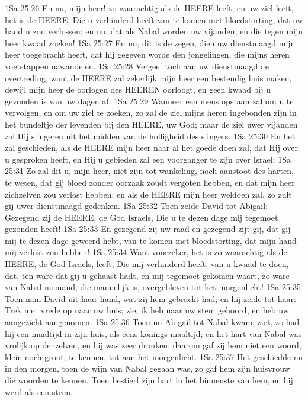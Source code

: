 1Sa 25:26  En nu, mijn heer! zo waarachtig als de HEERE leeft, en uw ziel leeft, het is de HEERE, Die u verhinderd heeft van te komen met bloedstorting, dat uw hand u zou verlossen; en nu, dat als Nabal worden uw vijanden, en die tegen mijn heer kwaad zoeken!
1Sa 25:27  En nu, dit is de zegen, dien uw dienstmaagd mijn heer toegebracht heeft, dat hij gegeven worde den jongelingen, die mijns heren voetstappen nawandelen.
1Sa 25:28  Vergeef toch aan uw dienstmaagd de overtreding, want de HEERE zal zekerlijk mijn heer een bestendig huis maken, dewijl mijn heer de oorlogen des HEEREN oorloogt, en geen kwaad bij u gevonden is van uw dagen af.
1Sa 25:29  Wanneer een mens opstaan zal om u te vervolgen, en om uw ziel te zoeken, zo zal de ziel mijns heren ingebonden zijn in het bundeltje der levenden bij den HEERE, uw God; maar de ziel uwer vijanden zal Hij slingeren uit het midden van de holligheid des slingers.
1Sa 25:30  En het zal geschieden, als de HEERE mijn heer naar al het goede doen zal, dat Hij over u gesproken heeft, en Hij u gebieden zal een voorganger te zijn over Israel;
1Sa 25:31  Zo zal dit u, mijn heer, niet zijn tot wankeling, noch aanstoot des harten, te weten, dat gij bloed zonder oorzaak zoudt vergoten hebben, en dat mijn heer zichzelven zou verlost hebben; en als de HEERE mijn heer weldoen zal, zo zult gij uwer dienstmaagd gedenken.
1Sa 25:32  Toen zeide David tot Abigail: Gezegend zij de HEERE, de God Israels, Die u te dezen dage mij tegemoet gezonden heeft!
1Sa 25:33  En gezegend zij uw raad en gezegend zijt gij, dat gij mij te dezen dage geweerd hebt, van te komen met bloedstorting, dat mijn hand mij verlost zou hebben!
1Sa 25:34  Want voorzeker, het is zo waarachtig als de HEERE, de God Israels, leeft, Die mij verhinderd heeft, van u kwaad te doen, dat, ten ware dat gij u gehaast hadt, en mij tegemoet gekomen waart, zo ware van Nabal niemand, die mannelijk is, overgebleven tot het morgenlicht!
1Sa 25:35  Toen nam David uit haar hand, wat zij hem gebracht had; en hij zeide tot haar: Trek met vrede op naar uw huis; zie, ik heb naar uw stem gehoord, en heb uw aangezicht aangenomen.
1Sa 25:36  Toen nu Abigail tot Nabal kwam, ziet, zo had hij een maaltijd in zijn huis, als eens konings maaltijd; en het hart van Nabal was vrolijk op denzelven, en hij was zeer dronken; daarom gaf zij hem niet een woord, klein noch groot, te kennen, tot aan het morgenlicht.
1Sa 25:37  Het geschiedde nu in den morgen, toen de wijn van Nabal gegaan was, zo gaf hem zijn huisvrouw die woorden te kennen. Toen bestierf zijn hart in het binnenste van hem, en hij werd als een steen.
